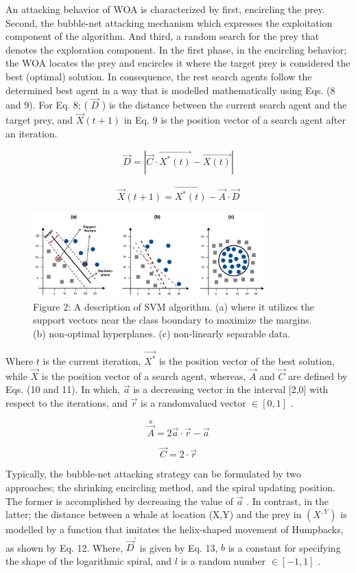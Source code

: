 \documentclass{article}
\begin{document}
An attacking behavior of WOA is characterized by first, encircling the prey. Second, the bubble-net attacking mechanism which expresses the exploitation component of the algorithm. And third, a random search for the prey that denotes the exploration component. In the first phase, in the encircling behavior; the WOA locates the prey and encircles it where the target prey is considered the best (optimal) solution. In consequence, the rest search agents follow the determined best agent in a way that is modelled mathematically using Eqs. (8 and 9). For Eq. 8; ( $\vec{D}$ ) is the distance between the current search agent and the target prey, and $\vec{X}(t+1)$ in Eq. 9 is the position vector of a search agent after an iteration.


\[
\vec{D}=|\vec{C}\cdot\vec{X^{*}(t)}-\vec{X(t)}|
\]


\[
\vec{X}(t+1)=\vec{X^{*}(t)}-\vec{A}\cdot\vec{D}
\]


\begin{figure}[htbp]
\centering
\includegraphics[width=0.8\textwidth]{images/ab40e7534200a28ad0392017099aeeaafed80ecd772ea2abf9eef4ad45a1a838.jpg}
\caption{Figure 2: A description of SVM algorithm. (a) where it utilizes the support vectors near the class boundary to maximize the margins. (b) non-optimal hyperplanes. (c) non-linearly separable data.}
\end{figure}


Where $t$ is the current iteration, $\vec{X^{*}}$ is the position vector of the best solution, while $\vec{X}$ is the position vector of a search agent, whereas, $\vec{A}$ and $\vec{C}$ are defined by Eqs. (10 and 11). In which, $\vec{a}$ is a decreasing vector in the interval [2,0] with respect to the iterations, and $\vec{r}$ is a randomvalued vector $\in\left[0,1\right]$ .


\[
\overset{\vartriangle}{\vec{A}}=2\vec{a}\cdot\vec{r}-\vec{a}
\]


\[
{\vec{C}}=2\cdot{\vec{r}}
\]


Typically, the bubble-net attacking strategy can be formulated by two approaches; the shrinking encircling method, and the spiral updating position. The former is accomplished by decreasing the value of $\vec{a}$ . In contrast, in the latter; the distance between a whale at location (X,Y) and the prey in $(X^{\textit{},Y^{}})$ is modelled by a function that imitates the helix-shaped movement of Humpbacks, as shown by Eq. 12. Where, $\vec{D}^{'}$ is given by Eq. 13, $b$ is a constant for specifying the shape of the logarithmic spiral, and $\textit{l}$ is a random number $\in[-1,1]$ .
\end{document}
